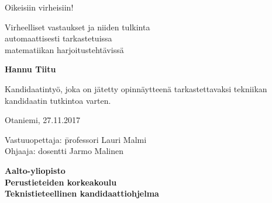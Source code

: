 {\parindent0pt %
\begin{spacing}{1.1}

 {\sffamily{}}
\end{spacing}

\vspace{12.7mm}

\begin{spacing}{1.63}
{\fontsize{17.8pt}{17.8pt}\selectfont Oikeisiin virheisiin!}
\end{spacing}

\vspace{10.5mm}

\begin{spacing}{1.2}
{\fontsize{13pt}{13pt}\selectfont Virheelliset vastaukset ja niiden tulkinta\\automaattisesti tarkastetuissa\\matematiikan harjoitustehtävissä}
\end{spacing}

\vspace{10.6mm}

{\fontsize{13.9pt}{13.9pt}\bfseries\sffamily\lsstyle Hannu Tiitu}

\vfill

{\fontsize{10.3pt}{10.3pt}\sffamily\lsstyle\raggedright
\begin{spacing}{1.06}

Kandidaatintyö, joka on jätetty opinnäytteenä tarkastettavaksi
tekniikan kandidaatin tutkintoa varten.

Otaniemi, 27.11.2017

\begin{tabbing}
Vastuuopettaja:\hspace{6mm} \= professori Lauri Malmi \\
Ohjaaja: \> dosentti Jarmo Malinen
\end{tabbing}
\vspace{-4mm}
\end{spacing}
} %

\vspace{11.5mm}

\begin{spacing}{.9}
{\bfseries\sffamily\lsstyle Aalto-yliopisto \\
Perustieteiden korkeakoulu \\
Teknistieteellinen kandidaattiohjelma}
\end{spacing}
} %



